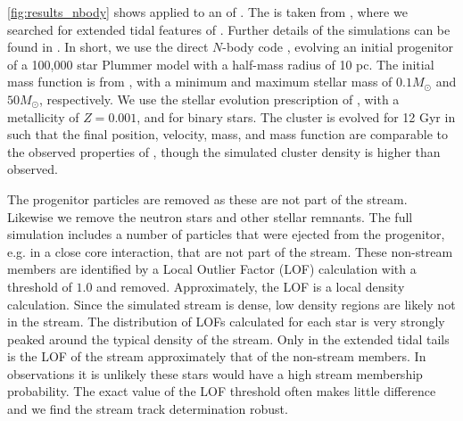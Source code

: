 \documentclass[fleqn,usenatbib]{mnras}
\begin{document}
    \autoref{fig:results_nbody} shows \trackstream{} applied to an \nbody{} of
    . The \nbody{} is taken from \citet{Starkman2019}, where
    we searched for extended tidal features of . Further
    details of the simulations can be found in \citet{Starkman2019}. In short,
    we use the direct $N$-body code \nbodysix{} \citep{Aarseth2006}, evolving an
    initial progenitor of a 100,000 star Plummer model with a half-mass radius
    of 10 pc. The initial mass function is from \citep{Kroupa2001ki}, with a
    minimum and maximum stellar mass of $0.1 M_\odot$ and $50 M_\odot$,
    respectively. We use the stellar evolution prescription of
    \citet{Hurley2000}, with a metallicity of $Z=0.001$, and \citet{Hurley2002}
    for binary stars. The cluster is evolved for 12 Gyr in \galpyMWPotential
    such that the final position, velocity, mass, and mass function are
    comparable to the observed properties of 
    \citep{Ibata2017, Grillmair2001}, though the simulated cluster density is
    higher than observed.

    The progenitor particles are removed as these are not part of the stream.
    Likewise we remove the neutron stars and other stellar remnants. The full
    \nbody{} simulation includes a number of particles that were ejected from
    the progenitor, e.g. in a close core interaction, that are not part of the
    stream. These non-stream members are identified by a Local Outlier Factor
    (LOF) calculation \citep{Breunig2000} with a threshold of $1.0$ and removed.
    Approximately, the LOF is a local density calculation. Since the simulated
    stream is dense, low density regions are likely not in the stream. The
    distribution of LOFs calculated for each star is very strongly peaked around
    the typical density of the stream. Only in the extended tidal tails is the
    LOF of the stream approximately that of the non-stream members. In
    observations it is unlikely these stars would have a high stream membership
    probability. The exact value of the LOF threshold often makes little
    difference and we find the stream track determination robust.
\end{document}
